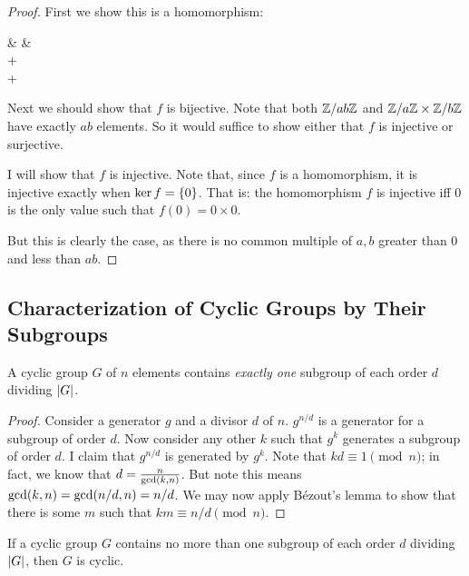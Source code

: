 \begin{proof}
  First we show this is a homomorphism:

  \begin{nedqn}
  & \mapsto &
     \times {}
  \\
  \eqcol
     \times {}
    +
     \times {}
  \\
  \eqcol
     + 
  \end{nedqn}

  Next we should show that $f$ is bijective. Note that both $\mathbb{Z} / ab\mathbb{Z}$
  and $\mathbb{Z} / a\mathbb{Z} \times \mathbb{Z} / b\mathbb{Z}$ have exactly $ab$ elements. So it would
  suffice to show either that $f$ is injective or surjective.

  I will show that $f$ is injective. Note that, since $f$ is a
  homomorphism, it is injective exactly when $\ker f = \left\{ 0 \right\}$. That
  is: the homomorphism $f$ is injective iff $0$ is the only value such
  that $f(0) = 0 \times 0$.

  But this is clearly the case, as there is no common multiple of $a, b$
  greater than $0$ and less than $ab$.
\end{proof}

\subsection{Characterization of Cyclic Groups by Their Subgroups}

\begin{proposition}
  A cyclic group $G$ of $n$ elements contains \emph{exactly one}
  subgroup of each order $d$ dividing $|G|$.
\end{proposition}

\begin{proof}
  Consider a generator $g$ and a divisor $d$ of $n$. $g^{n/d}$ is a
  generator for a subgroup of order $d$. Now consider any other $k$ such
  that $g^k$ generates a subgroup of order $d$. I claim that $g^{n/d}$
  is generated by $g^k$. Note that $kd \equiv 1 \pmod{n}$; in fact, we
  know that $d = \frac{n}{\gcd\mathopen{}\left( {k, n} \right)\mathclose{}}$. But note this means $\gcd\mathopen{}\left( {k,
  n} \right)\mathclose{} = \gcd\mathopen{}\left( {n/d, n} \right)\mathclose{} = n/d$. We may now apply Bézout's lemma to show
  that there is some $m$ such that $km \equiv n/d \pmod{n}$.
\end{proof}

\begin{proposition}
  If a cyclic group $G$ contains no more than one subgroup of each
  order $d$ dividing $|G|$, then $G$ is cyclic.
\end{proposition}

